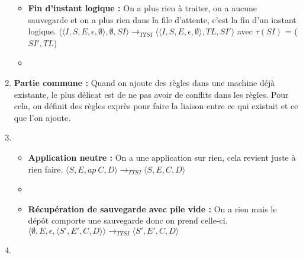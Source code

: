 \documentclass[10pt,a4paper]{report}
\begin{document}
\begin{enumerate}
\begin{itemize}
  \item[] \textbf{Fin d'instant logique :} On a plus rien à traiter, on a aucune sauvegarde et on a plus rien dans la file d'attente, c'est la fin d'un instant logique.
    \smallbreak
    $\langle\langle I,S,E,\epsilon,\emptyset \rangle ,\emptyset,SI\rangle 
    \longrightarrow_{TTSI} 
    \langle\langle I,S,E,\epsilon,\emptyset\rangle,TL,SI'\rangle$
    avec $\tau(SI)$ = ($SI',TL$) 
  \item[]
    
  \end{itemize}
\item[] \textbf{Partie commune :} Quand on ajoute des règles dans une machine déjà existante, le plus délicat est de ne pas avoir de conflits dans les règles. Pour cela, on définit des règles exprès pour faire la liaison entre ce qui existait et ce que l'on ajoute. 
\item[]
  \begin{itemize}
  \item[] \textbf{Application neutre :} On a une application sur rien, cela revient juste à rien faire.
    \smallbreak 
    $\langle S,E,ap~C,D\rangle
    \longrightarrow_{TTSI} 
    \langle S,E,C,D\rangle$
  \item[]
  \item[] \textbf{Récupération de sauvegarde avec pile vide :}  On a rien mais le dépôt comporte une sauvegarde donc on prend celle-ci.
    \smallbreak  
    $\langle \emptyset,E,\epsilon,\langle S',E',C,D\rangle\rangle
    \longrightarrow_{TTSI} 
    \langle S',E',C,D\rangle$
  \end{itemize}
  
\item[]
\end{enumerate}
\bigbreak
\bigbreak
\end{document}
